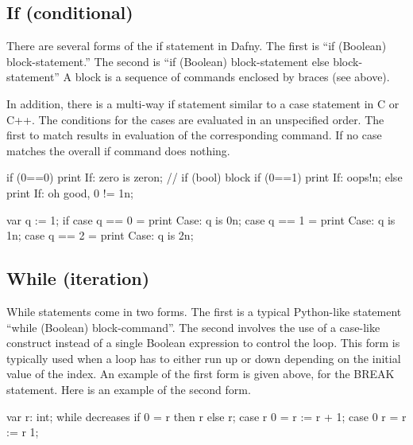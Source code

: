 \documentclass[letterpaper,10pt,english]{sphinxmanual}
\begin{document}
\subsection{If (conditional)}
\label{\detokenize{06-dafny-language:if-conditional}}
There are several forms of the if statement in Dafny.  The first is
“if (Boolean) block-statement.” The second is “if (Boolean)
block-statement else block-statement” A block is a sequence of
commands enclosed by braces (see above).

In addition, there is a multi-way if statement similar to a case
statement in C or C++. The conditions for the cases are evaluated in
an unspecified order. The first to match results in evaluation of the
corresponding command. If no case matches the overall if command does
nothing.

\begin{sphinxVerbatim}[commandchars=\\\{\}]
if (0==0) \PYGZob{} print \PYGZdq{}If: zero is zero\PYGZbs{}n\PYGZdq{}; \PYGZcb{}   // if (bool) \PYGZob{}block\PYGZcb{}
if (0==1)
    \PYGZob{} print \PYGZdq{}If: oops!\PYGZbs{}n\PYGZdq{}; \PYGZcb{}
else
    \PYGZob{} print \PYGZdq{}If: oh good, 0 != 1\PYGZbs{}n\PYGZdq{}; \PYGZcb{}

var q := 1;
if \PYGZob{}
    case q == 0 =\PYGZgt{} print \PYGZdq{}Case: q is 0\PYGZbs{}n\PYGZdq{};
    case q == 1 =\PYGZgt{} print \PYGZdq{}Case: q is 1\PYGZbs{}n\PYGZdq{};
    case q == 2 =\PYGZgt{} print \PYGZdq{}Case: q is 2\PYGZbs{}n\PYGZdq{};
\PYGZcb{}
\end{sphinxVerbatim}


\subsection{While (iteration)}
\label{\detokenize{06-dafny-language:while-iteration}}
While statements come in two forms. The first is a typical Python-like
statement “while (Boolean) block-command”. The second involves the use
of a case-like construct instead of a single Boolean expression to
control the loop. This form is typically used when a loop has to
either run up or down depending on the initial value of the index. An
example of the first form is given above, for the BREAK
statement. Here is an example of the second form.

\begin{sphinxVerbatim}[commandchars=\\\{\}]
var r: int;
while
    decreases if 0 \PYGZlt{}= r then r else \PYGZhy{}r;
\PYGZob{}
    case r \PYGZlt{} 0 =\PYGZgt{} \PYGZob{} r := r + 1; \PYGZcb{}
    case 0 \PYGZlt{} r =\PYGZgt{} \PYGZob{} r := r \PYGZhy{} 1; \PYGZcb{}
\PYGZcb{}
\end{sphinxVerbatim}
\end{document}
